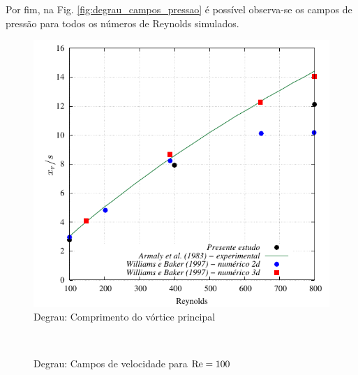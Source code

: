 \documentclass[tese_patricia]{subfiles}
\begin{document}
Por fim, na Fig. \ref{fig:degrau_campos_pressao} é possível observa-se os campos de pressão para todos os números de Reynolds simulados.

\begin{figure}[htb!]
	\centering
	\includegraphics[scale=1.2,trim=0cm 0cm 0cm 0cm, clip=true]{Imagens/Cap3/degrau_vort_prim.pdf}
	\caption{Degrau: Comprimento do vórtice principal}
	\label{fig:degrau_comprimento_vortice_principal}
\end{figure}

\begin{figure}[!htb]
	\centering
	 \\
	\caption{Degrau: Campos de velocidade para $\mathrm{Re} = 100$ }
	\label{fig:degrau_campos_velocidade_Re100}
\end{figure}
\end{document}

